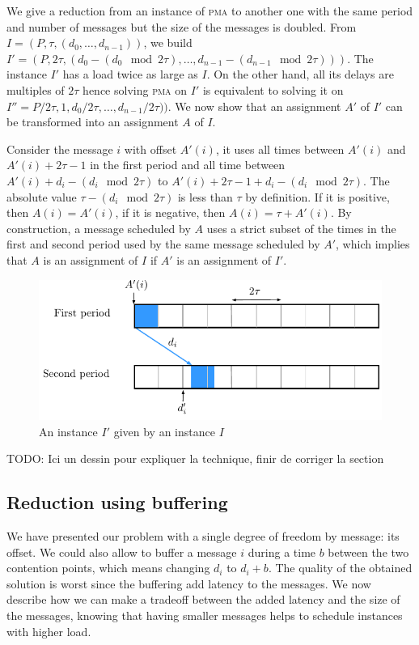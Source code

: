 \documentclass[10pt, conference, letterpaper]{IEEEtran}
\newcommand\pma{\textsc{pma}\xspace}
\newcommand{\todo}[1]{{\color{red} TODO: {#1}}}
\begin{document}
We give a reduction from an instance of \pma to another one with the same period and number of messages but 
the size of the messages is doubled. From $I = (P,\tau,(d_{0},\dots,d_{n-1}))$, we build $I' = (P, 2\tau, (d_{0}-(d_{0}\mod 2\tau),\dots,d_{n-1} - (d_{n-1} \mod 2\tau)))$. The instance $I'$ has a load twice as large as $I$.
On the other hand, all its delays are multiples of $2\tau$ hence solving \pma on $I'$ is equivalent to solving it on $I'' = P/2\tau, 1,d_{0}/ 2\tau,\dots,d_{n-1} /2\tau))$. We now show that an assignment $A'$ of $I'$ can be transformed into an assignment $A$ of $I$. 

Consider the message $i$ with offset $A'(i)$, it uses all times between $A'(i)$ and $A'(i) + 2\tau -1$ in the first period and all time between $A'(i) + d_{i} - (d_{i} \mod 2\tau)$ to $A'(i) + 2\tau -1+ d_{i} - (d_{i} \mod 2\tau)$.  The absolute value $\tau - (d_{i} \mod 2\tau)$ is less than $\tau$ by definition. If it is positive, then $A(i) = A'(i)$, if it is negative, then $A(i) = \tau + A'(i)$. By construction, a message scheduled by $A$ uses a strict subset of the times in the first and second period used by the same message scheduled by $A'$, which implies that $A$ is an assignment of $I$ if $A'$ is an assignment of $I'$. 

\begin{figure}[h]
\begin{center}

\includegraphics[scale=0.7]{transfo2tau}
\end{center}
\caption{An instance $I'$ given by an instance $I$ }
\end{figure}
\todo{Ici un dessin pour expliquer la technique, finir de corriger la section}


\subsection{Reduction using buffering}

We have presented our problem with a single degree of freedom by message: its
offset. We could also allow to buffer a message $i$ during a time $b$ between the two contention points, which means changing $d_i$ to $d_i + b$. The quality of the obtained solution is worst since the buffering add latency to the messages. We now describe how we can make a tradeoff between the added latency and the size of the messages, knowing that having smaller messages helps to schedule instances with higher load.
\end{document}
